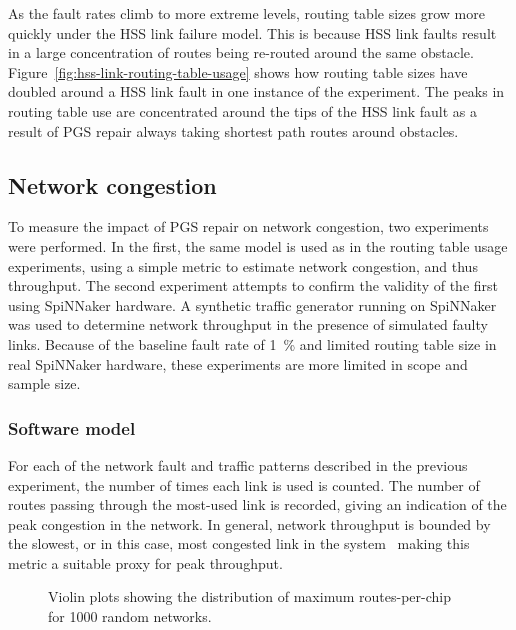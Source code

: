 			As the fault rates climb to more extreme levels, routing table sizes grow
			more quickly under the HSS link failure model. This is because HSS link
			faults result in a large concentration of routes being re-routed around
			the same obstacle. Figure~\ref{fig:hss-link-routing-table-usage} shows
			how routing table sizes have doubled around a HSS link fault in one
			instance of the experiment. The peaks in routing table use are
			concentrated around the tips of the HSS link fault as a result of PGS
			repair always taking shortest path routes around obstacles.
		
		\subsection{Network congestion}
			
			To measure the impact of PGS repair on network congestion, two
			experiments were performed. In the first, the same model is used as in
			the routing table usage experiments, using a simple metric to estimate
			network congestion, and thus throughput. The second experiment attempts
			to confirm the validity of the first using SpiNNaker hardware. A
			synthetic traffic generator running on SpiNNaker was used to determine
			network throughput in the presence of simulated faulty links.  Because of
			the baseline fault rate of \SI{1}{\percent} and limited routing table
			size in real SpiNNaker hardware, these experiments are more limited in
			scope and sample size.
			
			\subsubsection{Software model}
			
				For each of the network fault and traffic patterns described in the
				previous experiment, the number of times each link is used is counted.
				The number of routes passing through the most-used link is recorded,
				giving an indication of the peak congestion in the network.  In
				general, network throughput is bounded by the slowest, or in this case,
				most congested link in the system~\cite[chapter~1]{dally04} making this
				metric a suitable proxy for peak throughput.
				
				\begin{figure}
					\center
					
					\caption[Distribution of routes-per-chip for \num{1000} random networks.]%
					{Violin plots showing the distribution of maximum
					routes-per-chip for \num{1000} random networks.}
					\label{fig:routing-resource}
				\end{figure}
				
